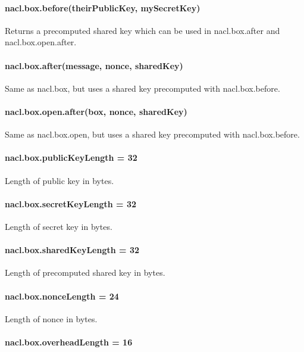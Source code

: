 \paragraph*{nacl.\+box.\+before(their\+Public\+Key, my\+Secret\+Key)}

Returns a precomputed shared key which can be used in {\ttfamily nacl.\+box.\+after} and {\ttfamily nacl.\+box.\+open.\+after}.

\paragraph*{nacl.\+box.\+after(message, nonce, shared\+Key)}

Same as {\ttfamily nacl.\+box}, but uses a shared key precomputed with {\ttfamily nacl.\+box.\+before}.

\paragraph*{nacl.\+box.\+open.\+after(box, nonce, shared\+Key)}

Same as {\ttfamily nacl.\+box.\+open}, but uses a shared key precomputed with {\ttfamily nacl.\+box.\+before}.

\paragraph*{nacl.\+box.\+public\+Key\+Length = 32}

Length of public key in bytes.

\paragraph*{nacl.\+box.\+secret\+Key\+Length = 32}

Length of secret key in bytes.

\paragraph*{nacl.\+box.\+shared\+Key\+Length = 32}

Length of precomputed shared key in bytes.

\paragraph*{nacl.\+box.\+nonce\+Length = 24}

Length of nonce in bytes.

\paragraph*{nacl.\+box.\+overhead\+Length = 16}

